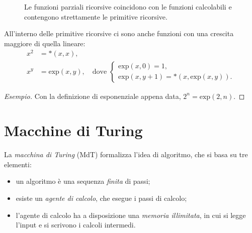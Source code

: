 \documentclass[a4paper, 11pt, oneside]{book}
\theoremstyle{formale}
\newenvironment{esempio}
    {\begin{proof}[\textit{Esempio}]\renewcommand{\qedsymbol}{$\diamond$}}
    {\end{proof}}
\begin{document}
    \begin{figure}[H]
        \centering
        \caption{Le funzioni parziali ricorsive coincidono con le funzioni calcolabili
            e contengono strettamente le primitive ricorsive.}
        \label{fig:ricorsive}
    \end{figure}

    All'interno delle primitive ricorsive ci sono anche funzioni con una crescita
    maggiore di quella lineare:
    \begin{align*}
        x^2 &= {*}(x, x), \\
        x^y &= \mathrm{exp}(x, y), \quad \text{dove }
        \begin{cases}
            \mathrm{exp}(x, 0) = 1, \\
            \mathrm{exp}(x, y + 1) = {*}(x, \mathrm{exp}(x, y)).
        \end{cases}
    \end{align*}

    \begin{esempio}
        Con la definizione di esponenziale appena data, $2^n = \mathrm{exp}(2, n)$.
    \end{esempio}

    \section{Macchine di Turing}
    \label{sec:mdt}
    La \emph{macchina di Turing} (MdT) formalizza l'idea di algoritmo, che si basa su
    tre elementi:
    \begin{itemize}
        \item un algoritmo \`e una sequenza \emph{finita} di passi;
        \item esiste un \emph{agente di calcolo}, che esegue i passi di calcolo;
        \item l'agente di calcolo ha a disposizione una \emph{memoria illimitata}, in cui
            si legge l'input e si scrivono i calcoli intermedi.
    \end{itemize}
\end{document}
